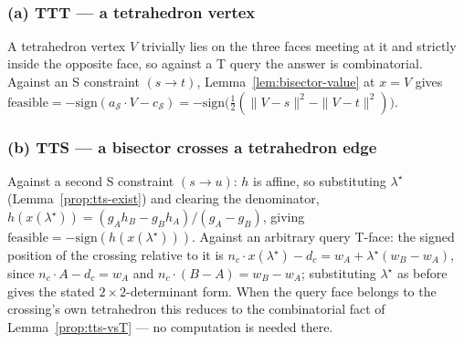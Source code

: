 \documentclass[12pt]{article}
\makeatletter
\theoremstyle{definition}
\theoremstyle{remark}
\renewenvironment{proof}[1][\proofname]{\par
  \pushQED{\qed}%
  \normalfont \footnotesize \topsep6\p@\@plus6\p@\relax
  \list{}{\leftmargin=2em
          \settowidth{\itemindent}{\itshape#1}%
          \labelwidth=\itemindent
          \parsep=0pt \listparindent=\parindent 
  }
  \item[\hskip\labelsep
        \itshape
    #1\@addpunct{.}]\ignorespaces
}{%
  \popQED\endlist\@endpefalse
}
\makeatother
\begin{document}
\FloatBarrier
\begin{proof}
~

\subsubsection*{(a) TTT --- a tetrahedron vertex}
A tetrahedron vertex $V$ trivially lies on the three faces meeting at it
and strictly inside the opposite face, so against a T query the answer is
combinatorial. Against an S constraint $(s\!\to\!t)$, Lemma~\ref{lem:bisector-value}
at $x=V$ gives $\mathrm{feasible}=-\mathrm{sign}(a_{\mathcal S}\cdot
V-c_{\mathcal S})=-\mathrm{sign}\big(\tfrac12(\|V-s\|^2-\|V-t\|^2)\big)$.

\subsubsection*{(b) TTS --- a bisector crosses a tetrahedron edge}
Against a second S constraint $(s\!\to\!u)$: $h$ is affine, so substituting
$\lambda^\star$ (Lemma~\ref{prop:tts-exist}) and clearing the denominator,
$h(x(\lambda^\star)) = (g_Ah_B-g_Bh_A)/(g_A-g_B)$, giving
$\mathrm{feasible}=-\mathrm{sign}(h(x(\lambda^\star)))$. Against an
arbitrary query T-face: the signed position of the crossing relative to it
is $n_c\cdot x(\lambda^\star)-d_c = w_A+\lambda^\star(w_B-w_A)$, since
$n_c\cdot A-d_c=w_A$ and $n_c\cdot(B-A)=w_B-w_A$; substituting $\lambda^\star$
as before gives the stated $2\times2$-determinant form. When the query face
belongs to the crossing's own tetrahedron this reduces to the combinatorial
fact of Lemma~\ref{prop:tts-vsT} --- no computation is needed there.


\end{proof}
\end{document}
